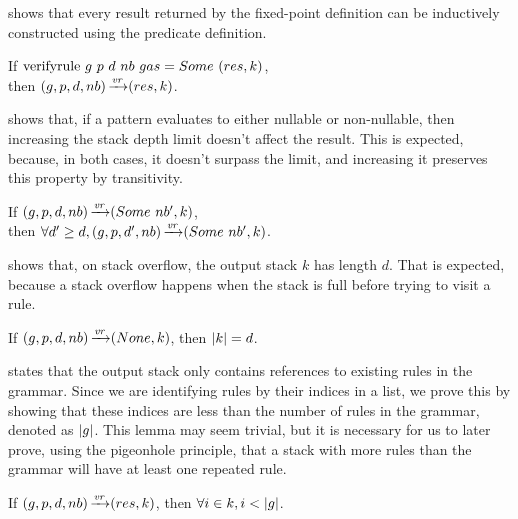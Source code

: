  shows that
every result returned by the fixed-point definition
can be inductively constructed using the predicate definition.

\begin{lemma}
    If $\text{verifyrule}{}\ g\ p\ d\ nb\ gas = Some\ (res, k)$, \\
    then $(g,p,d,nb) \operatorname{\xrightarrow{\mathit{vr}}} (res,k)$.
    \label{lemma:vr-follows}
\end{lemma}

 shows that,
if a pattern evaluates to either nullable or non-nullable,
then increasing the stack depth limit
doesn't affect the result.
This is expected,
because, in both cases,
it doesn't surpass the limit,
and increasing it preserves this property
by transitivity.

\begin{lemma}%
    If $(g,p,d,nb) \operatorname{\xrightarrow{\mathit{vr}}} (Some\ nb',k)$, \\
    then $\forall d' \ge d, (g,p,d',nb) \operatorname{\xrightarrow{\mathit{vr}}} (Some\ nb',k)$.
    \label{lemma:stack-depth-convergence-not-lr-pattern}
\end{lemma}

 shows that,
on stack overflow,
the output stack $k$ has length $d$.
That is expected,
because a stack overflow happens
when the stack is full
before trying to visit a rule.

\begin{lemma}%
    If $(g,p,d,nb) \operatorname{\xrightarrow{\mathit{vr}}} (None,k)$,
    then $|k| = d$.
    \label{lemma:stack-depth-lr-pattern}
\end{lemma}

 states
that the output stack
only contains references to
existing rules in the grammar.
Since we are identifying rules
by their indices in a list,
we prove this by showing that these indices
are less than the number of rules in the grammar,
denoted as $|g|$.
This lemma may seem trivial,
but it is necessary for us to later prove,
using the pigeonhole principle,
that a stack with more rules than the grammar
will have at least one repeated rule.

\begin{lemma}%
    If $(g,p,d,nb) \operatorname{\xrightarrow{\mathit{vr}}} (res,k)$,
    then $\forall i \in k, i < |g|$.
    \label{lemma:coherent-stack}
\end{lemma}

